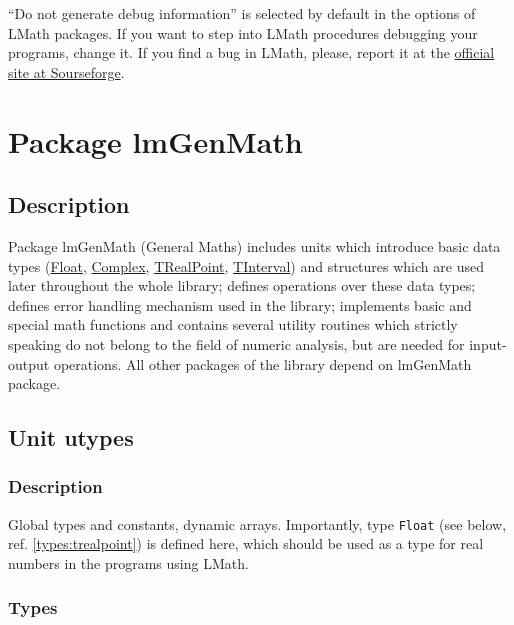 \documentclass[12pt,a4paper,oneside]{report}
\newcommand{\code}[1]{\texttt{#1}}
\begin{document}
``Do not generate debug information'' is selected by default in the options of LMath packages. If you want to step into LMath procedures debugging your programs, change it. If you find a bug in LMath, please, report it at the \href{https://sourceforge.net/p/lmath-library/tickets/}{official site at Sourseforge}.    
\chapter{Package lmGenMath}\label{package-lmGenMath}
\pagestyle{fancy}

\fancyhead[RO]{\rightmark}
\fancyhead[LO]{\leftmark}

\section{Description}
Package lmGenMath (General Maths) includes units which introduce basic data types (\hyperref[utypes-Float]{Float}, \hyperref[utypes-complex]{Complex}, \hyperref[types:trealpoint]{TRealPoint}, \hyperref[uIntervals.TInterval]{TInterval}) and structures which are used later throughout the whole library; defines operations over these data types; defines error handling mechanism used in the library; implements basic and special math functions and contains several utility routines which strictly speaking do not belong to the field of numeric analysis, but are needed for input-output operations. All other packages of the library depend on lmGenMath package.  


\section{Unit utypes}
\label{utypes}
\subsection{Description}
Global types and constants, dynamic arrays. Importantly, type \code{Float} (see below, ref. \ref{types:trealpoint}) is defined here, which should be used as a type for real numbers in the programs using LMath. 
\subsection{Types}
\end{document}

